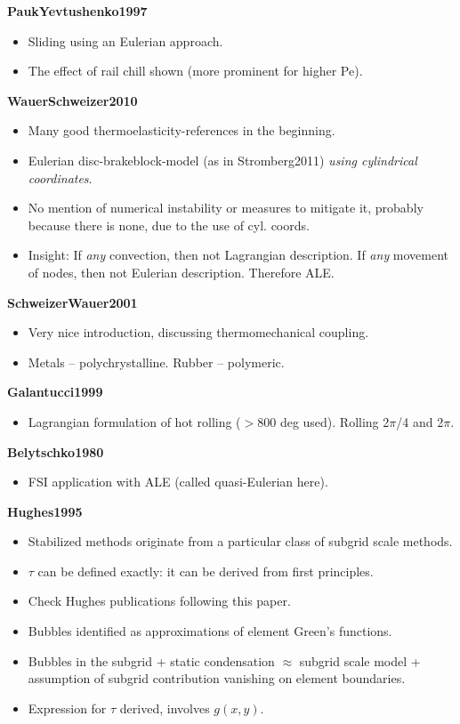 \documentclass{article}
\begin{document}
\textbf{PaukYevtushenko1997}
\begin{itemize}
\item Sliding using an Eulerian approach.
\item The effect of rail chill shown (more prominent for higher Pe).
\end{itemize}

\textbf{WauerSchweizer2010}
\begin{itemize}
\item Many good thermoelasticity-references in the beginning.
\item Eulerian disc-brakeblock-model (as in Stromberg2011) \emph{using cylindrical coordinates}.
\item No mention of numerical instability or measures to mitigate it, probably because there is none, due to the use of cyl. coords.
\item Insight: If \emph{any} convection, then not Lagrangian description. If \emph{any} movement of nodes, then not Eulerian description. Therefore ALE.
\end{itemize}

\textbf{SchweizerWauer2001}
\begin{itemize}
\item Very nice introduction, discussing thermomechanical coupling.
\item Metals -- polychrystalline. Rubber -- polymeric.
\end{itemize}

\textbf{Galantucci1999}
\begin{itemize}
\item Lagrangian formulation of hot rolling ($>$800 deg used). Rolling 2$\pi$/4 and 2$\pi$.
\end{itemize}

\textbf{Belytschko1980}
\begin{itemize}
\item FSI application with ALE (called quasi-Eulerian here).
\end{itemize}

\textbf{Hughes1995}
\begin{itemize}
\item Stabilized methods originate from a particular class of subgrid scale methods.
\item $\tau$ can be defined exactly: it can be derived from first principles.
\item Check Hughes publications following this paper.
\item Bubbles identified as approximations of element Green's functions.
\item Bubbles in the subgrid + static condensation $\approx$ subgrid scale model + assumption of subgrid contribution vanishing on element boundaries.
\item Expression for $\tau$ derived, involves $g(x,y)$.
\end{itemize}
\end{document}
